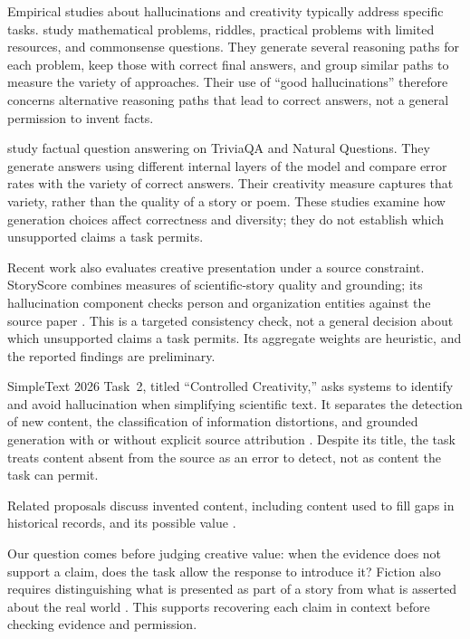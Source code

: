 \documentclass{clv2025}
\begin{document}
Empirical studies about hallucinations and creativity typically address specific tasks. \citet{sun_hallucinating_2024}
study mathematical problems, riddles, practical problems with limited
resources, and commonsense questions. They generate several reasoning paths
for each problem, keep those with correct final answers, and group similar
paths to measure the variety of approaches. Their use of ``good
hallucinations'' therefore concerns alternative reasoning paths that lead
to correct answers, not a general permission to invent facts.

\citet{he_shakespearean_2025} study factual question answering on TriviaQA
and Natural Questions. They generate answers using different internal
layers of the model and compare error rates with the variety of correct
answers. Their creativity measure captures that variety, rather than the
quality of a story or poem. These studies examine how generation choices
affect correctness and diversity; they do not establish which unsupported
claims a task permits.

Recent work also evaluates creative presentation under a source constraint.
StoryScore combines measures of scientific-story quality and grounding; its
hallucination component checks person and organization entities against the
source paper \citep{argese_storyscore_2026}. This is a targeted consistency
check, not a general decision about which unsupported claims a task permits.
Its aggregate weights are heuristic, and the reported findings are preliminary.

SimpleText 2026 Task~2, titled ``Controlled Creativity,'' asks systems to
identify and avoid hallucination when simplifying scientific text. It
separates the detection of new content, the classification of information
distortions, and grounded generation with or without explicit source
attribution \citep{simpletext_task2_2026}. Despite its title, the task
treats content absent from the source as an error to detect, not as
content the task can permit.

Related proposals discuss invented content, including content used to fill
gaps in historical records, and its possible value
\citep{sui_confabulation_2024,sui_critical_2025,yang_hicbench_2025}.

Our question comes before judging creative value: when the evidence does not
support a claim, does the task allow the response to introduce it? Fiction
also requires distinguishing what is presented as part of a story from what
is asserted about the real world \citep{searle_logical_1975}. This supports
recovering each claim in context before checking evidence and permission.
\end{document}
